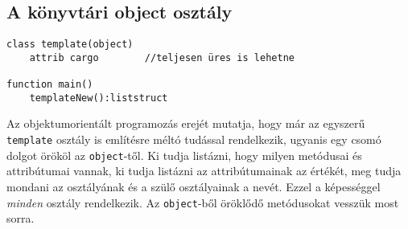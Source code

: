 \subsection{A könyvtári object osztály}

\begin{verbatim}
class template(object)
    attrib cargo        //teljesen üres is lehetne

function main()
    templateNew():liststruct
\end{verbatim}

Az objektumorientált programozás erejét mutatja, 
hogy már az egyszerű \verb!template! osztály is említésre 
méltó tudással rendelkezik, ugyanis egy csomó dolgot
örököl az \verb!object!-től. Ki tudja listázni,
hogy milyen metódusai és attribútumai vannak, ki tudja listázni
az attribútumainak az értékét, meg tudja mondani az osztályának
és a szülő osztályainak a nevét. Ezzel a képességgel
{\em minden\/} osztály rendelkezik.  
Az \verb!object!-ből öröklődő metódusokat vesszük most sorra.
